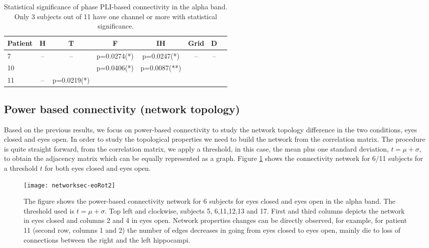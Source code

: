 \documentclass[11pt, onecolumn]{article}
\begin{document}
\begin{table}
\centering
\begin{tabular}{l*{6}{c}r}
Patient & H & T & F & IH & Grid & D  \\
\hline
7 & -- & -- &  p=0.0274(*) &  p=0.0247(*) & -- & -- \\ 
10 &  &  &   p=0.0406(*) &   p=0.0087(**) &  & \\ 
11 & --  &  p=0.0219(*) &  &  &  & \\
\end{tabular}
\caption{\label{Table:phaseconnectpli} 
Statistical significance of phase PLI-based connectivity in the alpha band. Only 3 subjects out of 11 have one channel or more with statistical significance.
}
\end{table}

\subsection{Power based connectivity (network topology)}
Based on the previous results, we focus on power-based connectivity to study the network topology difference in the two conditions, eyes closed and eyes open.  
In order to study the topological properties we need to build the network from the correlation matrix. The procedure is quite straight forward, from the correlation matrix, we apply a threshold, in this case, the mean plus one standard deviation, $t = \mu + \sigma$, to obtain the adjacency matrix which can be equally represented as a graph.
Figure \ref{fig:networkseceo} shows the connectivity network for 6/11 subjects for a threshold $t$ for both eyes closed and eyes open. 

\begin{figure}[H]
        \centering
        \texttt{[image: networksec-eoRot2]}
        \caption{The figure shows the power-based connectivity network for 6 subjects for eyes closed and eyes open in the alpha band. The threshold used is $t = \mu + \sigma$. Top left and clockwise, subjects 5, 6,11,12,13 and 17. First and third columns depicts the network in eyes closed and columns 2 and 4 in eyes open. Network properties changes can be directly observed, for example, for patient 11 (second row, columns 1 and 2) the number of edges decreases in going from eyes closed to eyes open, mainly die to loss of connections between the right and the left hippocampi.}    
\label{fig:networkseceo}
\end{figure}
\end{document}
